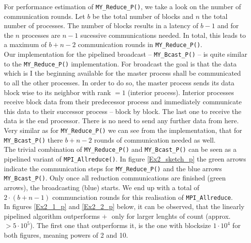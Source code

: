 For performance estimation of \texttt{MY\_Reduce\_P()}, we take a look on the number of communication rounds. Let $b$ 
be the total number of blocks and $n$ the total number of processes. The number of blocks results in a latency of $b-1$ 
and for the $n$ processes are $n-1$ sucessive communications needed. In total, this leads to a maximum of $b+n-2$ 
communication rounds in \texttt{MY\_Reduce\_P()}. \\

Our implementation for the pipelined broadcast -- \texttt{MY\_Bcast\_P()} -- is quite similar to the 
\texttt{MY\_Reduce\_P()} implementation. For broadcast the goal is that the data which is I the beginning 
available for the master process shall be communicated to all the other processes. In order to do so, the master 
process sends its data block wise to its neighbor with rank $=1$ (interior process). Interior processes receive block 
data from their predecessor process and immediately communicate this data to their successor process -- block by 
block. The last one to receive the data is the end processor. There is no need to send any further data from here.\\

Very similar as for \texttt{MY\_Reduce\_P()} we can see from the implementation, that for \texttt{MY\_Bcast\_P()} 
there $b+n-2$ rounds of communication needed as well. \\

The trivial combination of \texttt{MY\_Reduce\_P()} and \texttt{MY\_Bcast\_P()} can be seen as a pipelined variant 
of \texttt{MPI\_Allreduce()}. In figure \ref{Ex2_sketch_p} the green arrows indicate the communication steps for 
\texttt{MY\_Reduce\_P()} and the blue arrows \texttt{MY\_Bcast\_P()}. Only once all reduction communications
are finished (green arrows), the broadcasting (blue) starts. We end up with a total of $2\cdot(b+n-1)$ communciation 
rounds for this realisation of \texttt{MPI\_Allreduce}. \\ 

\pagebreak
In figures \ref{Ex2_1_p} and \ref{Ex2_2_p} below, it can be observed, that the linearly pipelined algorithm outperforms
\MPIRD  $+$ \MPIBC  $ $ only for larger lenghts of count (approx. $> 5 \cdot 10^{5}$). The first one that 
outperforms it, is the one with blocksize $1 \cdot 10^4$ for both figures, meaning powers of 2 and 10. 


